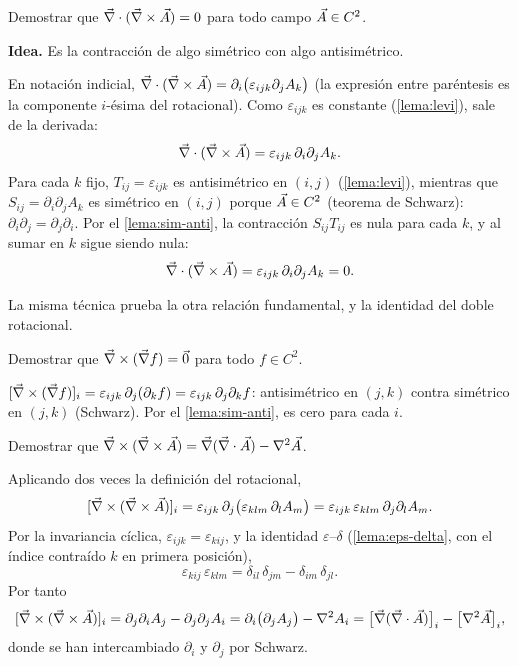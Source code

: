 \begin{ejercicio}\label{ejer:div-rot}
Demostrar que $\vec{\nabla}\cdot(\vec{\nabla}\times\vec{A})=0$ para todo campo $\vec{A}\in C^{2}$.
\end{ejercicio}
\begin{resolucion}
\textbf{Idea.} Es la contracción de algo simétrico con algo antisimétrico.

En notación indicial, $\vec{\nabla}\cdot(\vec{\nabla}\times\vec{A})=\partial_i\bigl(\varepsilon_{ijk}\partial_jA_k\bigr)$
(la expresión entre paréntesis es la componente $i$-ésima del rotacional).
Como $\varepsilon_{ijk}$ es constante (\cref{lema:levi}), sale de la derivada:
\[
  \vec{\nabla}\cdot(\vec{\nabla}\times\vec{A})=\varepsilon_{ijk}\,\partial_i\partial_jA_k .
\]
Para cada $k$ fijo, $T_{ij}=\varepsilon_{ijk}$ es antisimétrico en $(i,j)$
(\cref{lema:levi}), mientras que $S_{ij}=\partial_i\partial_jA_k$ es simétrico
en $(i,j)$ porque $\vec{A}\in C^{2}$ (teorema de Schwarz): $\partial_i\partial_j=\partial_j\partial_i$.
Por el \cref{lema:sim-anti}, la contracción $S_{ij}T_{ij}$ es nula para cada $k$, y
al sumar en $k$ sigue siendo nula:
\[
  \vec{\nabla}\cdot(\vec{\nabla}\times\vec{A})=\varepsilon_{ijk}\,\partial_i\partial_jA_k=0 .
\]
\end{resolucion}

La misma técnica prueba la otra relación fundamental, y la identidad del doble
rotacional.

\begin{ejercicio}\label{ejer:rot-grad}
Demostrar que $\vec{\nabla}\times(\vec{\nabla} f)=\vec{0}$ para todo $f\in C^{2}$.
\end{ejercicio}
\begin{resolucion}
$[\vec{\nabla}\times(\vec{\nabla} f)]_i=\varepsilon_{ijk}\,\partial_j(\partial_kf)=\varepsilon_{ijk}\,\partial_j\partial_kf$:
antisimétrico en $(j,k)$ contra simétrico en $(j,k)$ (Schwarz). Por el
\cref{lema:sim-anti}, es cero para cada $i$.
\end{resolucion}

\begin{ejercicio}\label{ejer:rotrot}
Demostrar que $\vec{\nabla}\times(\vec{\nabla}\times\vec{A})=\vec{\nabla}(\vec{\nabla}\cdot\vec{A})-\nabla^{2}\vec{A}$.
\end{ejercicio}
\begin{resolucion}
Aplicando dos veces la definición del rotacional,
\[
  [\vec{\nabla}\times(\vec{\nabla}\times\vec{A})]_i=\varepsilon_{ijk}\,\partial_j\bigl(\varepsilon_{klm}\,\partial_lA_m\bigr)
  =\varepsilon_{ijk}\,\varepsilon_{klm}\,\partial_j\partial_lA_m .
\]
Por la invariancia cíclica, $\varepsilon_{ijk}=\varepsilon_{kij}$, y la identidad $\varepsilon$--$\delta$
(\cref{lema:eps-delta}, con el índice contraído $k$ en primera posición),
\[
  \varepsilon_{kij}\,\varepsilon_{klm}=\delta_{il}\,\delta_{jm}-\delta_{im}\,\delta_{jl} .
\]
Por tanto
\[
  [\vec{\nabla}\times(\vec{\nabla}\times\vec{A})]_i=\partial_j\partial_iA_j-\partial_j\partial_jA_i
  =\partial_i\bigl(\partial_jA_j\bigr)-\nabla^{2} A_i
  =\bigl[\vec{\nabla}(\vec{\nabla}\cdot\vec{A})\bigr]_i-\bigl[\nabla^{2}\vec{A}\bigr]_i ,
\]
donde se han intercambiado $\partial_i$ y $\partial_j$ por Schwarz.
\end{resolucion}

